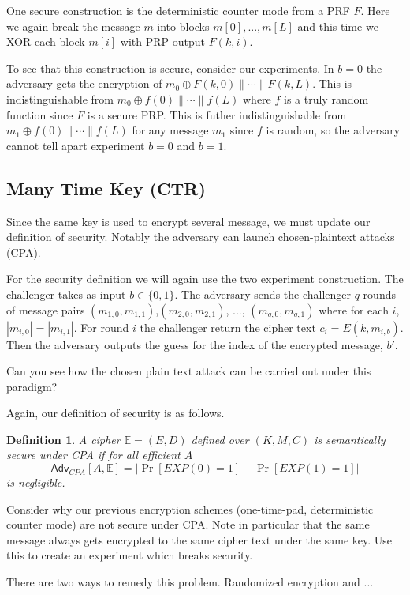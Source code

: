 \documentclass[twoside]{article}
\newtheorem{definition}[theorem]{Definition}
\newcommand\E{\mathbb{E}}
\def\Adv{\mathsf{Adv}}
\def\xor{\oplus}
\begin{document}
One secure construction is the deterministic counter mode from a PRF $F$. Here we again break the message $m$ into blocks $m[0], ..., m[L]$ and this time we XOR each block $m[i]$ with PRP output $F(k, i)$.

To see that this construction is secure, consider our experiments. In $b=0$ the adversary gets the encryption of $m_0 \xor F(k,0) \parallel \cdots \parallel F(k, L)$. This is indistinguishable from  $m_0 \xor f(0) \parallel \cdots \parallel f(L)$ where $f$ is a truly random function since $F$ is a secure PRP. This is futher indistinguishable from $m_1 \xor f(0) \parallel \cdots \parallel f(L)$ for any message $m_1$ since $f$ is random, so the adversary cannot tell apart experiment $b = 0$ and $b = 1$. 

\subsection{Many Time Key (CTR)}
Since the same key is used to encrypt several message, we must update our definition of security. Notably the adversary can launch chosen-plaintext attacks (CPA).

For the security definition we will again use the two experiment construction. The challenger takes as input $b \in \{0,1\}$. The adversary sends the challenger $q$ rounds of message pairs $(m_{1,0}, m_{1,1})$,$ (m_{2,0}, m_{2,1})$, ..., $(m_{q, 0}, m_{q, 1})$ where for each $i$, $|m_{i,0}| = |m_{i,1}|$. For round $i$ the challenger return the cipher text $c_i = E(k, m_{i,b})$. Then the adversary outputs the guess for the index of the encrypted message, $b'$.

Can you see how the chosen plain text attack can be carried out under this paradigm? 

Again, our definition of security is as follows.
\begin{definition}
A cipher $\E = (E, D)$ defined over $(K,M,C)$ is semantically secure under CPA if for all \emph{efficient} $A$
\[\Adv_{CPA}[A, \E] = \left| \Pr[EXP(0) = 1] - \Pr[EXP(1) = 1] \right|\]
is negligible.
\end{definition}

Consider why our previous encryption schemes (one-time-pad, deterministic counter mode) are not secure under CPA. Note in particular that the same message always gets encrypted to the same cipher text under the same key. Use this to create an experiment which breaks security.

There are two ways to remedy this problem. Randomized encryption and ...
\end{document}

